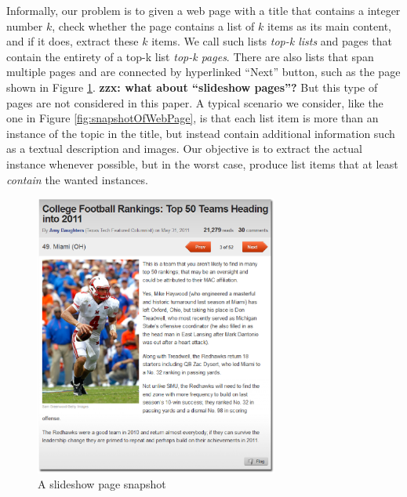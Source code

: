 Informally, our problem is to given a web page with a title that contains
a integer number $k$, check whether the page contains a list of $k$ items
as its main content, and if it does, extract these $k$ items. 
We call such lists {\em top-k lists} and pages that contain the 
entirety of a top-k list {\em top-k pages}.
There are also lists that span
multiple pages and are connected by hyperlinked ``Next'' button, such as
the page\cite{example2} shown in Figure \ref{fig:multipagelist}.
{\bf zzx: what about ``slideshow pages''?}
But this type of pages
are not considered in this paper. A typical scenario we consider, 
like the one in Figure \ref{fig:snapshotOfWebPage}, is that
each list item is more than an instance of the topic in the title, 
but instead contain additional information such as 
a textual description and images. Our objective
is to extract the actual instance whenever possible, but in the worst case,
produce list items that at least {\em contain} the wanted instances.

\begin{figure}[h]
	\centering
	\includegraphics[width=8cm]{./pic/page4.eps}
	\caption{A slideshow page snapshot}
	\label{fig:multipagelist}
\end{figure}

